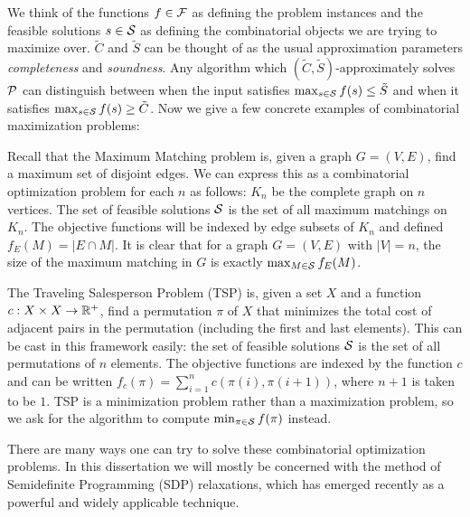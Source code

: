 We think of the functions $f \in \mathcal F$ as defining the problem instances and the feasible solutions $s \in \mathcal S$ as defining the combinatorial objects we are 
trying to maximize over. $\tilde{C}$ and $\tilde{S}$ can be thought of as the usual approximation parameters \emph{completeness} and \emph{soundness}. Any
algorithm which $(\tilde{C},\tilde{S})$-approximately solves $\mathcal P$ can distinguish between when the input satisfies $\max_{s\in \mathcal S} f(s) \leq \tilde{S}$ and when it satisfies $\max_{s \in\mathcal S} f(s) \geq \tilde{C}$. Now we give a few concrete examples of combinatorial maximization problems:
\begin{example}
Recall that the Maximum Matching problem is, given a graph $G = (V,E)$, find a maximum set of disjoint edges. We can express this as a combinatorial optimization problem for each $n$ as follows: $K_n$ be the complete graph on $n$ vertices. The set of feasible solutions $\mathcal S$ is the set of all maximum matchings on $K_n$. The objective functions will be indexed by edge subsets of $K_n$ and defined $f_E(M) = |E \cap M|$. It is clear that for a graph $G = (V, E)$ with $|V| = n$, the size of the maximum matching in $G$ is exactly $\max_{M \in \mathcal S} f_E(M)$.
\end{example}
\begin{example}
The Traveling Salesperson Problem (TSP) is, given a set $X$ and a function $c: X\times X \rightarrow \mathbb R^+$, find a permutation $\pi$ of $X$ that minimizes the total cost of adjacent pairs in the permutation (including the first and last elements). This can be cast in this framework easily: the set of feasible solutions $\mathcal S$ is the set of all permutations of $n$ elements. The objective functions are indexed by the function $c$ and can be written $f_c(\pi) = \sum_{i=1}^n c(\pi(i),\pi(i+1))$, where $n+1$ is taken to be $1$. TSP is a minimization problem rather than a maximization problem, so we ask for the algorithm to compute $\min_{\pi \in \mathcal S} f(\pi)$ instead. 
\end{example}
There are many ways one can try to solve these combinatorial optimization problems. In this dissertation we will mostly be concerned with the method of Semidefinite Programming (SDP) relaxations, which has emerged recently as a powerful and widely applicable technique. 

